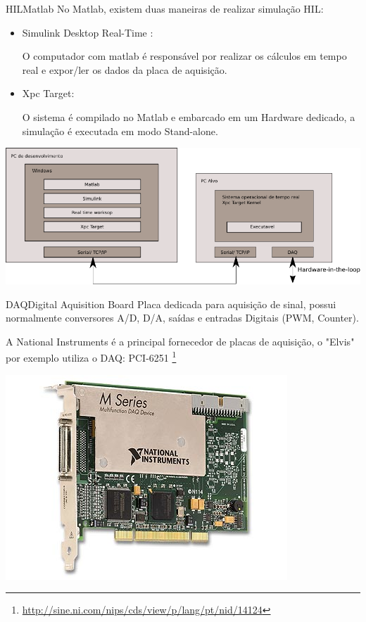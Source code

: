 \documentclass{beamer}
\begin{document}
\begin{frame}{HIL}{Matlab}
	No Matlab, existem duas maneiras de realizar simulação HIL: 
	
	\begin{itemize}
	\item Simulink Desktop Real-Time :
	
	O computador com matlab é responsável por realizar os cálculos em tempo real e expor/ler os dados da placa de aquisição.
	
	\item Xpc Target:
	
	O sistema é compilado no Matlab e embarcado em um Hardware dedicado, a simulação é executada em modo Stand-alone.
	\end{itemize}

	\begin{center}
	\includegraphics[width=0.8\linewidth]{flux-xpc}
	\end{center}
\end{frame}

\begin{frame}{DAQ}{Digital Aquisition Board}	
	Placa dedicada para aquisição de sinal, possui normalmente conversores A/D, D/A, saídas e entradas Digitais (PWM, Counter).
	
	A National Instruments é a principal fornecedor de placas de aquisição, o "Elvis" por exemplo utiliza o DAQ: PCI-6251 
	\footnote{\tiny \url{http://sine.ni.com/nips/cds/view/p/lang/pt/nid/14124}}
	
	\begin{center}
	\includegraphics[width=0.4\linewidth]{pci_6251}
	\end{center}
\end{frame}
\end{document}
